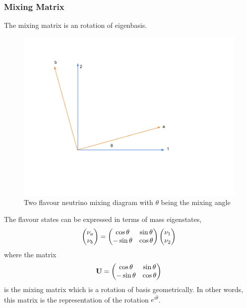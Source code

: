 \documentclass[letterpaper,12pt,english]{sphinxmanual}
\begin{document}
\subsubsection{Mixing Matrix}
\label{oscillations:mixing-matrix}
The mixing matrix is an rotation of eigenbasis.
\begin{figure}[htbp]
\centering
\capstart

\includegraphics{nuetrinoMixingAngle.png}
\caption{Two flavour neutrino mixing diagram with \(\theta\) being the mixing angle}\end{figure}

The flavour states can be expressed in terms of mass eigenstates,
\begin{gather}
\begin{split}\begin{pmatrix}\nu_a \\ \nu_b\end{pmatrix} = \begin{pmatrix}  \cos\theta  & \sin\theta \\ -\sin\theta  & \cos\theta \end{pmatrix}   \begin{pmatrix}\nu_1 \\ \nu_2\end{pmatrix}\end{split}\notag
\end{gather}
where the matrix
\begin{gather}
\begin{split}\mathbf U = \begin{pmatrix}  \cos\theta  &  \sin\theta \\ -\sin\theta  & \cos\theta \end{pmatrix}\end{split}\notag
\end{gather}
is the mixing matrix which is a rotation of basis geometrically. In other words, this matrix is the representation of the rotation \(e^{i\hat\theta}\).
\end{document}
